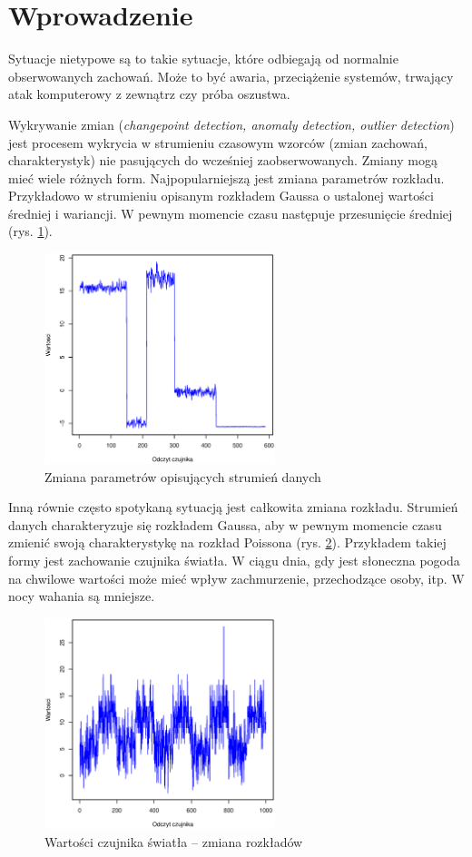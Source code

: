 \section{Wprowadzenie}

Sytuacje nietypowe są to takie sytuacje,
które odbiegają od normalnie obserwowanych zachowań.
Może to być awaria, przeciążenie systemów,
trwający atak komputerowy z zewnątrz czy próba oszustwa.

Wykrywanie zmian (\textit{changepoint detection, anomaly detection, outlier detection}) jest procesem
wykrycia w strumieniu czasowym wzorców (zmian zachowań, charakterystyk) nie pasujących do wcześniej zaobserwowanych.
Zmiany mogą mieć wiele różnych form.
Najpopularniejszą jest zmiana parametrów rozkładu.
Przykładowo w strumieniu opisanym rozkładem Gaussa o ustalonej wartości średniej i wariancji.
W pewnym momencie czasu następuje przesunięcie średniej (rys. \ref{fig:SignalData}).
\begin{figure}[htbp]
\centering
	\includegraphics[width=0.6\textwidth]{img/ch-2-data}
	\caption{Zmiana parametrów opisujących strumień danych}
  \label{fig:SignalData}
\end{figure}
Inną równie często spotykaną sytuacją jest całkowita zmiana rozkładu.
Strumień danych charakteryzuje się rozkładem Gaussa,
aby w pewnym momencie czasu zmienić swoją charakterystykę na rozkład Poissona (rys. \ref{fig:SignalDist}).
Przykładem takiej formy jest zachowanie czujnika światła.
W ciągu dnia, gdy jest słoneczna pogoda na chwilowe wartości może mieć wpływ zachmurzenie, przechodzące osoby, itp.
W nocy wahania są mniejsze.
\begin{figure}[htbp]
\centering
	\includegraphics[width=0.6\textwidth]{img/ch-2-dist}
	\caption{Wartości czujnika światła -- zmiana rozkładów}
  \label{fig:SignalDist}
\end{figure}


